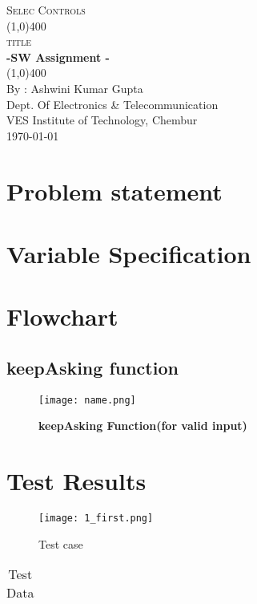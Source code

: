 \documentclass[11pt]{article}
\newcounter{imageCounter}
\begin{document}
	
	\begin{titlepage}
		\begin{center}
			\vspace*{1cm}
			\Large{\textsc{Selec Controls}}\\
			\vfill
			\line(1,0){400}\\[1mm]
			\Huge{\textsc{title}}\\ [3mm]
			\huge{\textbf{-SW Assignment -}}\\ [1mm]
			\line(1,0){400}\\
			\vfill 
			\large{By : Ashwini Kumar Gupta\\
			Dept. Of Electronics \& Telecommunication\\
			VES Institute of Technology, Chembur \\}
			\today\\
			
		\end{center}
	\end{titlepage}
	
	\tableofcontents
	\thispagestyle{empty}
	\clearpage
	
	\setcounter{page}{1}
	
	\section{Problem statement}
		
	\section{Variable Specification}
		
		 
	\section{Flowchart}
	
		\subsection{keepAsking function}
			\begin{figure}[H]
				\texttt{[image: name.png]}
				\caption{\textbf{keepAsking Function(for valid input)}}
				
			\end{figure}
		
			
	\section{Test Results}			
			
			\begin{figure}[H]
				\centering 
				\texttt{[image: 1\_first.png]}
				\caption{Test case \theimageCounter}
			\end{figure}
			\begin{table}[h!]
				\centering
				\caption{Test Data}
				\vspace*{2mm}
				\begin{tabular}{|c|c|c|c|c|c|c|}
				
				\end{tabular} 
			\end{table}
\end{document}
